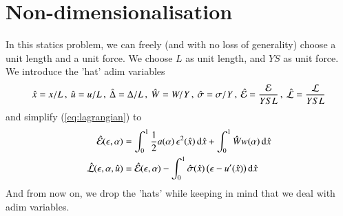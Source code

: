 \documentclass[final,3p,times,authoryear]{elsarticle}
\renewcommand*\d{\mathop{}\!\mathrm{d}} %
\begin{document}
\section{Non-dimensionalisation} \label{sec:going_admin}
%
%
%
%
%
%
%
In this statics problem, we can freely (and with no loss of generality) choose a unit length and a unit force. We choose $L$ as unit length, and $YS$ as unit force.
We introduce the 'hat' adim variables
\begin{align}
\hat{x}=x/L \, , \:
\hat{u}=u/L \, , \:
\hat{\Delta}=\Delta/L \, , \:
\hat{W}=W/Y \, , \:
\hat{\sigma}=\sigma/Y \, , \:
\hat{{\cal E}}=\frac{{\cal E}}{YSL}  \, , \:
\hat{{\cal L}}=\frac{{\cal L}}{YSL}
\end{align}
and simplify (\ref{eq:lagrangian}) to
\begin{subequations}
\label{eq:going_adim}
\begin{align}
\hat{{\cal E}}(\epsilon,\alpha)& =
\int_0^1 \frac12  a(\alpha) \, \epsilon^2(\hat{x}) \d \hat{x}+ \int_0^1 \hat{W}  w(\alpha) \d \hat{x} \\
\hat{{\cal L}}(\epsilon,\alpha,\hat{u}) & = \hat{{\cal E}}(\epsilon,\alpha) -
\int_0^1 \hat{\sigma}(\hat{x})  \,  \big( \epsilon-u'(\hat{x}) \big) \d \hat{x}
\end{align}
\end{subequations}
And from now on, we drop the 'hats' while keeping in mind that we deal with adim variables.

%
%
%
%
%
%
%
\end{document}
